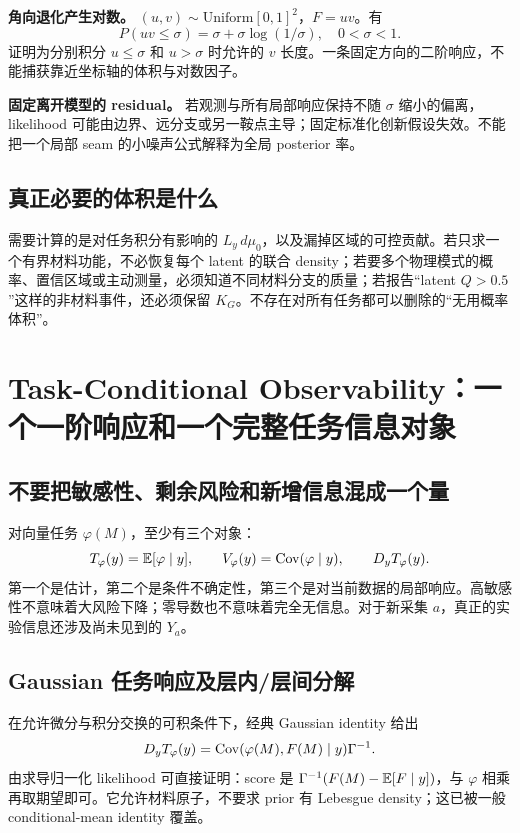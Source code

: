 \textbf{角向退化产生对数。} $(u,v)\sim\mathrm{Uniform}[0,1]^2$，$F=uv$。有
\[
P(uv\le\sigma)=\sigma+\sigma\log(1/\sigma),\quad0<\sigma<1.
\]
证明为分别积分 $u\le\sigma$ 和 $u>\sigma$ 时允许的 $v$ 长度。一条固定方向的二阶响应，不能捕获靠近坐标轴的体积与对数因子。

\textbf{固定离开模型的 residual。} 若观测与所有局部响应保持不随 $\sigma$ 缩小的偏离，likelihood 可能由边界、远分支或另一鞍点主导；固定标准化创新假设失效。不能把一个局部 seam 的小噪声公式解释为全局 posterior 率。

\subsection{真正必要的体积是什么}
需要计算的是对任务积分有影响的 $L_y\,d\mu_0$，以及漏掉区域的可控贡献。若只求一个有界材料功能，不必恢复每个 latent 的联合 density；若要多个物理模式的概率、置信区域或主动测量，必须知道不同材料分支的质量；若报告“latent $Q>0.5$”这样的非材料事件，还必须保留 $K_G$。不存在对所有任务都可以删除的“无用概率体积”。

\section{Task-Conditional Observability：一个一阶响应和一个完整任务信息对象}
\label{sec:taskinfo}

\subsection{不要把敏感性、剩余风险和新增信息混成一个量}
对向量任务 $\varphi(M)$，至少有三个对象：
\[
T_\varphi(y)=\mathbb E[\varphi\mid y],\qquad
V_\varphi(y)=\operatorname{Cov}(\varphi\mid y),\qquad
D_yT_\varphi(y).
\]
第一个是估计，第二个是条件不确定性，第三个是对当前数据的局部响应。高敏感性不意味着大风险下降；零导数也不意味着完全无信息。对于新采集 $a$，真正的实验信息还涉及尚未见到的 $Y_a$。

\subsection{Gaussian 任务响应及层内/层间分解}
在允许微分与积分交换的可积条件下，经典 Gaussian identity 给出
\begin{equation}
D_yT_\varphi(y)=
\operatorname{Cov}(\varphi(M),F(M)\mid y)\Gamma^{-1}.
\label{eq:task-score}
\end{equation}
由求导归一化 likelihood 可直接证明：score 是
$\Gamma^{-1}(F(M)-\mathbb E[F\mid y])$，与 $\varphi$ 相乘再取期望即可。它允许材料原子，不要求 prior 有 Lebesgue density；这已被一般 conditional-mean identity 覆盖。

